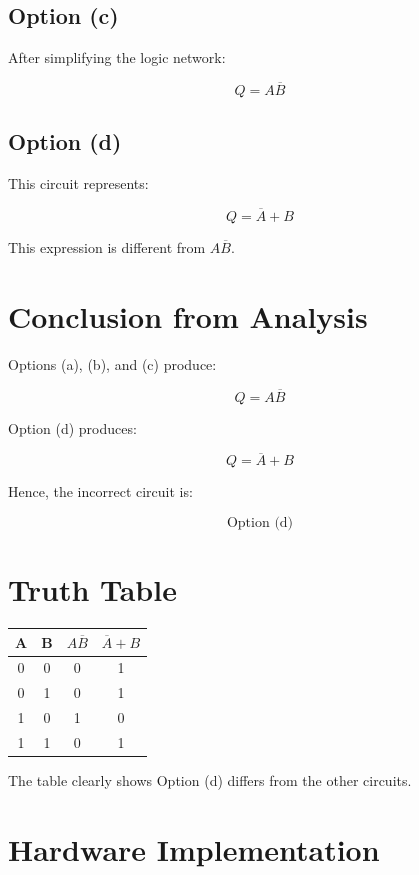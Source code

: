 \documentclass[12pt,a4paper]{article}
\begin{document}
\subsection*{Option (c)}

After simplifying the logic network:

\[
Q = A\overline{B}
\]

\subsection*{Option (d)}

This circuit represents:

\[
Q = \overline{A} + B
\]

This expression is different from $A\overline{B}$.

\section*{Conclusion from Analysis}

Options (a), (b), and (c) produce:

\[
Q = A\overline{B}
\]

Option (d) produces:

\[
Q = \overline{A} + B
\]

Hence, the incorrect circuit is:

\[
\boxed{\text{Option (d)}}
\]

\section*{Truth Table}

\begin{center}
\begin{tabular}{|c|c|c|c|}
\hline
A & B & $A\overline{B}$ & $\overline{A}+B$ \\
\hline
0 & 0 & 0 & 1 \\
0 & 1 & 0 & 1 \\
1 & 0 & 1 & 0 \\
1 & 1 & 0 & 1 \\
\hline
\end{tabular}
\end{center}

The table clearly shows Option (d) differs from the other circuits.

\section*{Hardware Implementation}
\end{document}
